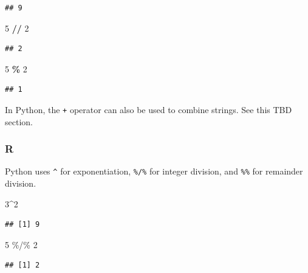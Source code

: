 \documentclass[
]{book}
\newenvironment{Shaded}{\begin{snugshade}}{\end{snugshade}}
\newcommand{\DecValTok}[1]{\textcolor[rgb]{0.00,0.00,0.81}{#1}}
\newcommand{\OperatorTok}[1]{\textcolor[rgb]{0.81,0.36,0.00}{\textbf{#1}}}
\newcommand{\SpecialCharTok}[1]{\textcolor[rgb]{0.00,0.00,0.00}{#1}}
\begin{document}
\begin{verbatim}
## 9
\end{verbatim}

\begin{Shaded}
\begin{Highlighting}[]
\DecValTok{5} \OperatorTok{//} \DecValTok{2}
\end{Highlighting}
\end{Shaded}

\begin{verbatim}
## 2
\end{verbatim}

\begin{Shaded}
\begin{Highlighting}[]
\DecValTok{5} \OperatorTok{\%} \DecValTok{2}
\end{Highlighting}
\end{Shaded}

\begin{verbatim}
## 1
\end{verbatim}

In Python, the \texttt{+} operator can also be used to combine strings. See this TBD section.

\hypertarget{r}{%
\subsubsection*{R}\label{r}}

Python uses \texttt{\^{}} for exponentiation, \texttt{\%/\%} for integer division, and \texttt{\%\%} for remainder division.

\begin{Shaded}
\begin{Highlighting}[]
\DecValTok{3}\SpecialCharTok{\^{}}\DecValTok{2}
\end{Highlighting}
\end{Shaded}

\begin{verbatim}
## [1] 9
\end{verbatim}

\begin{Shaded}
\begin{Highlighting}[]
\DecValTok{5} \SpecialCharTok{\%/\%} \DecValTok{2}
\end{Highlighting}
\end{Shaded}

\begin{verbatim}
## [1] 2
\end{verbatim}
\end{document}
